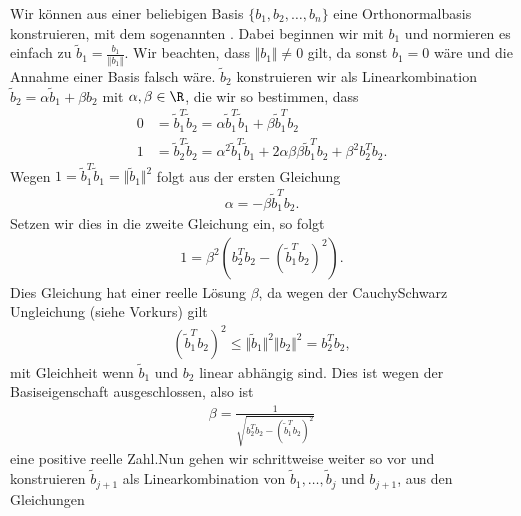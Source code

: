 \documentclass[letterpaper,10pt,english]{jupyterBook}
\begin{document}
Wir können aus einer beliebigen Basis \(\{b_1,b_2, \ldots,b_n\}\) eine Orthonormalbasis konstruieren, mit dem sogenannten . Dabei beginnen wir mit \(b_1\) und normieren es einfach zu \(\tilde b_1 = \frac{b_1}{\Vert b_1\Vert}\). Wir beachten, dass \(\Vert b_1\Vert \neq 0\) gilt, da sonst \(b_1=0\) wäre und die Annahme einer Basis falsch wäre. \(\tilde b_2\) konstruieren wir als Linearkombination \(\tilde b_2 = \alpha \tilde b_1 + \beta b_2\) mit \(\alpha, \beta \in \R\), die wir so bestimmen, dass
\begin{align*}
0 &=  \tilde b_1^T \tilde b_2 = \alpha \tilde b_1^T \tilde b_1 + \beta \tilde b_1^T b_2\\
1 &=  \tilde b_2^T \tilde b_2 = \alpha^2 \tilde b_1^T \tilde b_1 + 2 \alpha \beta \beta \tilde b_1^T b_2 + \beta^2 b_2^T b_2.
\end{align*}
Wegen \(1 = \tilde b_1^T \tilde b_1 = \Vert \tilde b_1 \Vert^2\) folgt aus der ersten Gleichung
\begin{equation*}
\begin{split} \alpha = - \beta \tilde b_1^T b_2.\end{split}
\end{equation*}
Setzen wir dies in die zweite Gleichung ein, so folgt
\begin{equation*}
\begin{split} 1 = \beta^2 ( b_2^T b_2 - (\tilde b_1^T b_2)^2).\end{split}
\end{equation*}
Dies Gleichung hat einer reelle Lösung \(\beta\), da wegen der Cauchy\sphinxhyphen{}Schwarz Ungleichung (siehe Vorkurs) gilt
\begin{equation*}
\begin{split} (\tilde b_1^T b_2)^2 \leq \Vert \tilde b_1 \Vert^2 \Vert b_2 \Vert^2 =  b_2^T b_2 ,\end{split}
\end{equation*}
mit Gleichheit wenn \(\tilde b_1\) und \(b_2\) linear abhängig sind. Dies ist wegen der Basiseigenschaft ausgeschlossen, also ist
\begin{equation*}
\begin{split} \beta = \frac{1}{\sqrt{b_2^T b_2 - (\tilde b_1^T b_2)^2}} \end{split}
\end{equation*}
eine positive reelle Zahl.Nun gehen wir schrittweise weiter so vor und konstruieren \(\tilde b_{j+1}\) als Linearkombination von \(\tilde b_1, \ldots, \tilde b_j\) und \(b_{j+1}\), aus den Gleichungen
\end{document}
